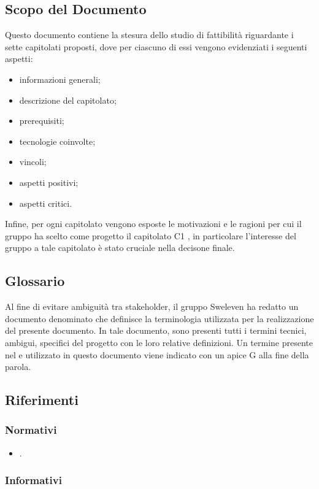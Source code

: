 \subsection{Scopo del Documento}
Questo documento contiene la stesura dello studio di fattibilità riguardante i sette capitolati proposti, dove per ciascuno di essi vengono evidenziati i seguenti aspetti:
\begin{itemize}
    \item informazioni generali;
    \item descrizione del capitolato;
    \item prerequisiti;
    \item tecnologie coinvolte;
    \item vincoli;
    \item aspetti positivi;
    \item aspetti critici.
\end{itemize}
Infine, per ogni capitolato vengono esposte le motivazioni e le ragioni per cui il gruppo ha scelto come progetto il capitolato C1 \NomeProgetto{}, in particolare l’interesse del gruppo a tale capitolato è stato cruciale nella decisone finale.
\subsection{Glossario}
Al fine di evitare ambiguità tra stakeholder, il gruppo Sweleven ha redatto un documento denominato \Glossariov{} che definisce la terminologia utilizzata per la realizzazione del presente documento.
In tale documento, sono presenti tutti i termini tecnici, ambigui, specifici del progetto con le loro relative definizioni.
Un termine presente nel \Gv{} e utilizzato in questo documento viene indicato con un apice G alla fine della parola.
\subsection{Riferimenti}

\subsubsection{Normativi}
\begin{itemize}
\item \NdPv {}.
\end{itemize}

\subsubsection{Informativi}

